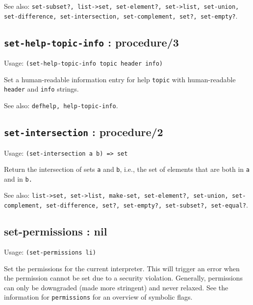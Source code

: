 \documentclass[
]{article}
\newcommand{\passthrough}[1]{#1}
\begin{document}
See also:
\passthrough{\lstinline!set-subset?, list->set, set-element?, set->list, set-union, set-difference, set-intersection, set-complement, set?, set-empty?!}.

\hypertarget{set-help-topic-info-procedure3-1}{%
\subsection{\texorpdfstring{\texttt{set-help-topic-info} :
procedure/3}{set-help-topic-info : procedure/3}}\label{set-help-topic-info-procedure3-1}}

Usage: \passthrough{\lstinline!(set-help-topic-info topic header info)!}

Set a human-readable information entry for help
\passthrough{\lstinline!topic!} with human-readable
\passthrough{\lstinline!header!} and \passthrough{\lstinline!info!}
strings.

See also: \passthrough{\lstinline!defhelp, help-topic-info!}.

\hypertarget{set-intersection-procedure2-1}{%
\subsection{\texorpdfstring{\texttt{set-intersection} :
procedure/2}{set-intersection : procedure/2}}\label{set-intersection-procedure2-1}}

Usage: \passthrough{\lstinline!(set-intersection a b) => set!}

Return the intersection of sets \passthrough{\lstinline!a!} and
\passthrough{\lstinline!b!}, i.e., the set of elements that are both in
\passthrough{\lstinline!a!} and in \passthrough{\lstinline!b.!}

See also:
\passthrough{\lstinline!list->set, set->list, make-set, set-element?, set-union, set-complement, set-difference, set?, set-empty?, set-subset?, set-equal?!}.

\hypertarget{set-permissions-nil-1}{%
\subsection{set-permissions : nil}\label{set-permissions-nil-1}}

Usage: \passthrough{\lstinline!(set-permissions li)!}

Set the permissions for the current interpreter. This will trigger an
error when the permission cannot be set due to a security violation.
Generally, permissions can only be downgraded (made more stringent) and
never relaxed. See the information for
\passthrough{\lstinline!permissions!} for an overview of symbolic flags.
\end{document}

